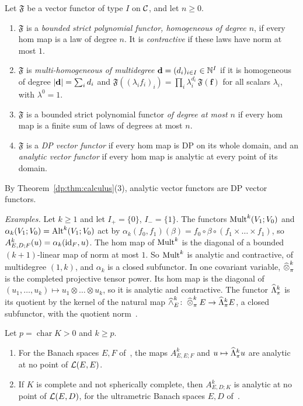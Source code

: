 \begin{definition}\label{dp:def:poly-functor}
Let $\mathfrak F$ be a vector functor of type $I$ on $\mathcal{C}$, and let $n\ge0$.
\begin{enumerate}
\item $\mathfrak F$ is a \emph{bounded strict polynomial functor, homogeneous of degree $n$}, if every hom map is a law of degree $n$. It is \emph{contractive} if these laws have norm at most $1$.
\item $\mathfrak F$ is \emph{multi-homogeneous of multidegree} $\mathbf d=(d_i)_{i\in I}\in\mathbb N^I$ if it is homogeneous of degree $\lvert \mathbf d\rvert=\sum_id_i$ and $\mathfrak F((\lambda_if_i)_i)=\prod_i\lambda_i^{d_i}\,\mathfrak F(\mathbf f)$ for all scalars $\lambda_i$, with $\lambda^0=1$.
\item $\mathfrak F$ is a bounded strict polynomial functor \emph{of degree at most $n$} if every hom map is a finite sum of laws of degrees at most $n$.
\item $\mathfrak F$ is a \emph{DP vector functor} if every hom map is DP on its whole domain, and an \emph{analytic vector functor} if every hom map is analytic at every point of its domain.
\end{enumerate}
\end{definition}

By Theorem~\ref{dp:thm:calculus}(3), analytic vector functors are DP vector functors.

\emph{Examples.} Let $k\ge1$ and let $I_+=\{0\}$, $I_-=\{1\}$. The functors $\operatorname{Mult}^k(V_1;V_0)$ and $\alpha_k(V_1;V_0)=\operatorname{Alt}^k(V_1;V_0)$ act by $\alpha_k(f_0,f_1)(\beta)=f_0\circ\beta\circ(f_1\times\dots\times f_1)$, so $A^k_{E,D;F}(u)=\alpha_k(\mathrm{id}_F,u)$. The hom map of $\operatorname{Mult}^k$ is the diagonal of a bounded $(k+1)$\nobreakdash-linear map of norm at most $1$. So $\operatorname{Mult}^k$ is analytic and contractive, of multidegree $(1,k)$, and $\alpha_k$ is a closed subfunctor. In one covariant variable, $\mathbin{\widehat\otimes}^k_\pi$ is the completed projective tensor power. Its hom map is the diagonal of $(u_1,\dots,u_k)\mapsto u_1\otimes\dots\otimes u_k$, so it is analytic and contractive. The functor $\widehat\Lambda^k_\pi$ is its quotient by the kernel of the natural map $\widehat\wedge^k_E\colon\mathbin{\widehat\otimes}^k_\pi E\to\widehat\Lambda^k_\pi E$, a closed subfunctor, with the quotient norm~\cite[Lemma~3.7, Definition~3.8(1)]{I}.

\begin{lemma}\label{dp:fn:lem:witnesses}
Let $p=\operatorname{char}K>0$ and $k\ge p$.
\begin{enumerate}
\item For the Banach spaces $E,F$ of~\cite[Theorem~7.2(1)]{I}, the maps $A^k_{E,E;F}$ and $u\mapsto\widehat\Lambda^k_\pi u$ are analytic at no point of $\mathcal L(E,E)$.
\item If $K$ is complete and not spherically complete, then $A^k_{E,D;K}$ is analytic at no point of $\mathcal L(E,D)$, for the ultrametric Banach spaces $E,D$ of~\cite[Theorem~7.2(2)]{I}.
\end{enumerate}
\end{lemma}

